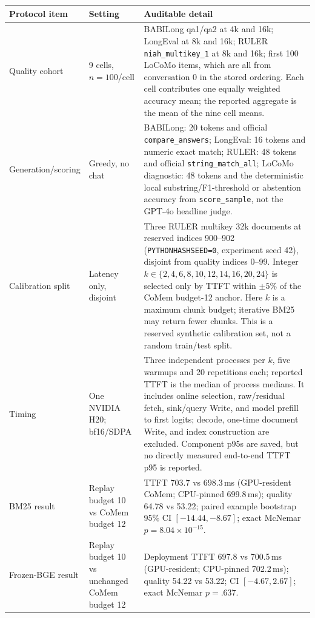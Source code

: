 \begin{table}[!tp]
\centering
\scriptsize
\setlength{\tabcolsep}{3pt}
\begin{tabular}{@{}p{}p{}p{}@{}}
\toprule
\textbf{Protocol item} & \textbf{Setting} & \textbf{Auditable detail} \\
\midrule
Quality cohort & 9 cells, $n{=}100$/cell &
BABILong qa1/qa2 at 4k and 16k; LongEval at 8k and 16k;
RULER \texttt{niah\_multikey\_1} at 8k and 16k; first 100 LoCoMo items,
which are all from conversation 0 in the stored ordering.
Each cell contributes one equally weighted accuracy mean; the reported aggregate
is the mean of the nine cell means. \\
Generation/scoring & Greedy, no chat &
BABILong: 20 tokens and official \texttt{compare\_answers};
LongEval: 16 tokens and numeric exact match; RULER: 48 tokens and official
\texttt{string\_match\_all}; LoCoMo diagnostic: 48 tokens and the deterministic
local substring/F1-threshold or abstention accuracy from
\texttt{score\_sample}, not the GPT-4o headline judge. \\
Calibration split & Latency only, disjoint &
Three RULER multikey 32k documents at reserved indices 900--902
(\texttt{PYTHONHASHSEED=0}, experiment seed 42), disjoint from quality indices
0--99. Integer $k\in\{2,4,6,8,10,12,14,16,20,24\}$ is selected only by TTFT
within $\pm5\%$ of the CoMem budget-12 anchor. Here $k$ is a maximum chunk
budget; iterative BM25 may return fewer chunks. This is a reserved synthetic
calibration set, not a random train/test split. \\
Timing & One NVIDIA H20; bf16/SDPA &
Three independent processes per $k$, five warmups and 20 repetitions each;
reported TTFT is the median of process medians. It includes online selection,
raw/residual fetch, sink/query Write, and model prefill to first logits; decode,
one-time document Write, and index construction are excluded. Component p95s
are saved, but no directly measured end-to-end TTFT p95 is reported. \\
BM25 result & Replay budget 10 vs CoMem budget 12 &
TTFT 703.7 vs 698.3\,ms (GPU-resident CoMem; CPU-pinned 699.8\,ms);
quality 64.78 vs 53.22; paired example bootstrap 95\% CI
$[-14.44,-8.67]$; exact McNemar $p=8.04{\times}10^{-15}$. \\
Frozen-BGE result & Replay budget 10 vs unchanged CoMem budget 12 &
Deployment TTFT 697.8 vs 700.5\,ms (GPU-resident; CPU-pinned 702.2\,ms);
quality 54.22 vs 53.22; CI $[-4.67,2.67]$; exact McNemar $p=.637$.

\end{tabular}
\end{table}
